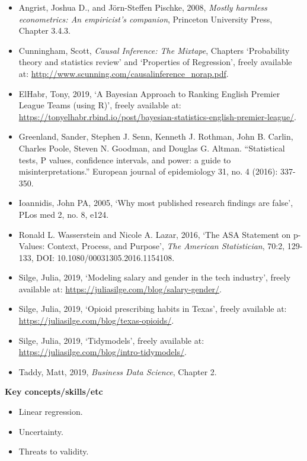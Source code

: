 \documentclass[
]{book}
\providecommand{\tightlist}{%
  \setlength{\itemsep}{0pt}\setlength{\parskip}{0pt}}
\begin{document}
\begin{itemize}
\tightlist
\item
  Angrist, Joshua D., and Jörn-Steffen Pischke, 2008, \emph{Mostly harmless econometrics: An empiricist's companion}, Princeton University Press, Chapter 3.4.3.
\item
  Cunningham, Scott, \emph{Causal Inference: The Mixtape}, Chapters `Probability theory and statistics review' and `Properties of Regression', freely available at: \url{http://www.scunning.com/causalinference_norap.pdf}.
\item
  ElHabr, Tony, 2019, `A Bayesian Approach to Ranking English Premier League Teams (using R)', freely available at: \url{https://tonyelhabr.rbind.io/post/bayesian-statistics-english-premier-league/}.
\item
  Greenland, Sander, Stephen J. Senn, Kenneth J. Rothman, John B. Carlin, Charles Poole, Steven N. Goodman, and Douglas G. Altman. ``Statistical tests, P values, confidence intervals, and power: a guide to misinterpretations.'' European journal of epidemiology 31, no. 4 (2016): 337-350.
\item
  Ioannidis, John PA, 2005, `Why most published research findings are false', PLos med 2, no. 8, e124.
\item
  Ronald L. Wasserstein and Nicole A. Lazar, 2016, `The ASA Statement on p-Values: Context, Process, and Purpose', \emph{The American Statistician}, 70:2, 129-133, DOI: 10.1080/00031305.2016.1154108.
\item
  Silge, Julia, 2019, `Modeling salary and gender in the tech industry', freely available at: \url{https://juliasilge.com/blog/salary-gender/}.
\item
  Silge, Julia, 2019, `Opioid prescribing habits in Texas', freely available at: \url{https://juliasilge.com/blog/texas-opioids/}.
\item
  Silge, Julia, 2019, `Tidymodels', freely available at: \url{https://juliasilge.com/blog/intro-tidymodels/}.
\item
  Taddy, Matt, 2019, \emph{Business Data Science}, Chapter 2.
\end{itemize}

\textbf{Key concepts/skills/etc}

\begin{itemize}
\tightlist
\item
  Linear regression.
\item
  Uncertainty.
\item
  Threats to validity.
\end{itemize}
\end{document}
